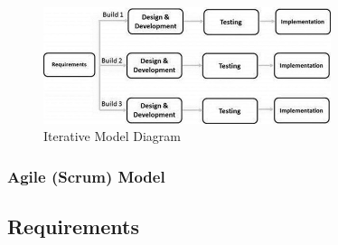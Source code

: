 \begin{figure}[htb]
    \centering
    \includegraphics[width=0.75\textwidth]{02_dev_process/res/sdlc_iterative_model.jpg}
    \caption[Iterative Model Diagram]{Iterative Model Diagram}
\end{figure}

\subsubsection{Agile (Scrum) Model}

\subsection{Requirements}
